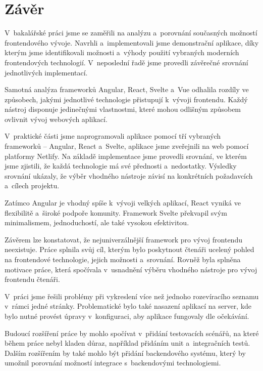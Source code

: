 \section*{Závěr}

V~bakalářské práci jsme se zaměřili na analýzu a~porovnání současných možností frontendového vývoje. 
Navrhli a~implementovali jsme demonstrační aplikace, díky kterým jsme identifikovali možnosti a~výhody použití vybraných moderních frontendových technologií. 
V~neposlední řadě jsme provedli závěrečné srovnání jednotlivých implementací.

Samotná analýza frameworků Angular, React, Svelte a~Vue odhalila rozdíly ve způsobech, jakými jednotlivé technologie přistupují k~vývoji frontendu. 
Každý nástroj disponuje jedinečnými vlastnostmi, které mohou odlišným způsobem ovlivnit vývoj webových aplikací. 

V~praktické části jsme naprogramovali aplikace pomocí tří vybraných frameworků -- Angular, React a~Svelte, aplikace jsme zveřejnili na web pomocí platformy Netlify. 
Na základě implementace jsme provedli srovnání, ve kterém jsme zjistili, že každá technologie má své přednosti a~nedostatky. 
Výsledky srovnání ukázaly, že výběr vhodného nástroje závisí na konkrétních požadavcích a~cílech projektu.

Zatímco Angular je vhodný spíše k~vývoji velkých aplikací, React vyniká ve flexibilitě a~široké podpoře komunity. 
Framework Svelte překvapil svým minimalismem, jednoduchostí, ale také vysokou efektivitou.

Závěrem lze konstatovat, že nejuniverzálnější framework pro vývoj frontendu neexistuje. 
Práce splnila svůj cíl, kterým bylo poskytnout čtenáři ucelený pohled na frontendové technologie, jejich možnosti a~srovnání.
Rovněž byla splněna motivace práce, která spočívala v~usnadnění výběru vhodného nástroje pro vývoj frontendu čtenáři.

V~práci jsme řešili problémy při vykreslení více než jednoho rozevíracího seznamu v~rámci jedné stránky. 
Problematické bylo také nasazení aplikací na server, kde bylo nutné provést úpravy v~konfiguraci, aby aplikace fungovaly dle očekávání.

Budoucí rozšíření práce by mohlo spočívat v~přidání testovacích scénářů, na které během práce nebyl kladen důraz, například přidáním unit a~integračních testů.
Dalším rozšířením by také mohlo být přidání backendového systému, který by umožnil porovnání možností integrace s~backendovými technologiemi.

